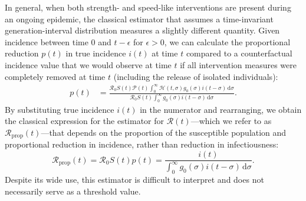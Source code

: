 \documentclass[12pt]{article}
\newcommand{\Rx}[1]{\ensuremath{{\mathcal R}_{#1}}\xspace}
\newcommand{\Ro}{\Rx{0}}
\newcommand{\RR}{\ensuremath{{\mathcal R}}\xspace}
\newcommand{\Rprop}{\Rx{\mathrm{prop}}}
\newcommand{\dd}[1]{\ensuremath{\, \mathrm{d}#1}}
\newcommand{\dsigma}{\dd{\sigma}}
\newcommand{\PP}{{\mathcal P}}
\newcommand{\HH}{\ensuremath{\mathcal H}}
\begin{document}
In general, when both strength- and speed-like interventions are present during an ongoing epidemic, the classical estimator that assumes a time-invariant generation-interval distribution measures a slightly different quantity.
Given incidence between time $0$ and $t-\epsilon$ for $\epsilon > 0$, we can calculate the proportional reduction $p(t)$ in true incidence $i(t)$ at time $t$ compared to a counterfactual incidence value that we would observe at time $t$ if all intervention measures were completely removed at time $t$ (including the release of isolated individuals):
\begin{align}
p(t) &= \frac{\Ro S(t) \PP(t) \int_0^\infty \HH(t, \sigma) g_0(\sigma) i(t-\sigma)\dsigma}{\Ro S(t) \int_0^\infty g_0(\sigma) i(t-\sigma) \dsigma}.
\end{align}
By substituting true incidence $i(t)$ in the numerator and rearranging, we obtain the classical expression for the estimator for $\RR(t)$---which we refer to as $\Rprop(t)$---that depends on the proportion of the susceptible population and proportional reduction in incidence, rather than reduction in infectiousness:
\begin{equation}
\Rprop(t) = \Ro S(t) p(t) = \frac{i(t)}{\int_0^\infty g_0(\sigma) i(t-\sigma) \dsigma}.
\end{equation}
Despite its wide use, this estimator is difficult to interpret and does not necessarily serve as a threshold value.
\end{document}
